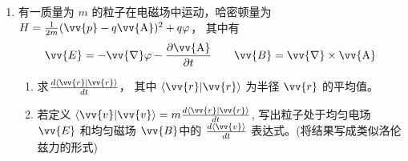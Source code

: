 \begin{enumerate}
\item 
有一质量为 $m$ 的粒子在电磁场中运动，哈密顿量为 $H=\frac{1}{2 m}(\vv{p}-q \vv{\mathrm{A}})^{2}+q \varphi$， 其中有
\[ 
\vv{E}=-\vv{\nabla} \varphi-\frac{\partial \vv{\mathrm{A}}}{\partial t}  \qquad \vv{B}=\vv{\nabla} \times \vv{\mathrm{A}}
 \]
\begin{enumerate}
	\item
	求$\frac{d\braket{\vv{r}}}{d t}$， 其中 $\braket{\vv{r}}$ 为半径 $\vv{r}$ 的平均值。
	
	\item 
	若定义 $\braket{\vv{v}}=m \frac{d\braket{\vv{r}}}{d t}$, 写出粒子处于均匀电场 $ \vv{E} $ 和均匀磁场 $ \vv{B}  $中的 $\frac{d\langle\vv{v}\rangle}{d t}$ 表达式。(将结果写成类似洛伦兹力的形式)
	
\end{enumerate}


 
 
\end{enumerate}

